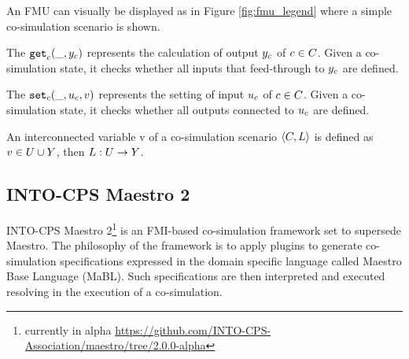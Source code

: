 \documentclass[runningheads]{llncs}
\begin{document}
An FMU can visually be displayed as in Figure \ref{fig:fmu_legend} where a simple co-simulation scenario is shown.

\begin{definition}\label{def:getout}
The $\mathtt{get}_{c}(\_, y_{c})$ represents the calculation of output $y_{c}$ of $c \in C$. Given a co-simulation state, it checks whether all inputs that feed-through to $y_{c}$ are defined.
\end{definition}

\begin{definition}\label{def:setin}
The $\mathtt{set}_{c}(\_, u_{c}, v)$ represents the setting of input $u_{c}$  of $c \in C$. Given a co-simulation state, it checks whether all outputs connected to $u_{c}$ are defined.
\end{definition}

\begin{definition}
An interconnected variable v of a co-simulation scenario $ \left\langle C, L \right\rangle $ is defined as $v \in U \cup Y$, then $L : U \to Y$.
\end{definition}

\subsection{INTO-CPS Maestro 2}
INTO-CPS Maestro 2\footnote{currently in alpha \url{https://github.com/INTO-CPS-Association/maestro/tree/2.0.0-alpha}}\cite{thule_maestro2_2019} is an FMI-based co-simulation framework set to supersede Maestro\cite{Maestro}. The philosophy of the framework is to apply plugins to generate co-simulation specifications expressed in the domain specific language called Maestro Base Language (MaBL). Such specifications are then interpreted and executed resolving in the execution of a co-simulation.
\end{document}
